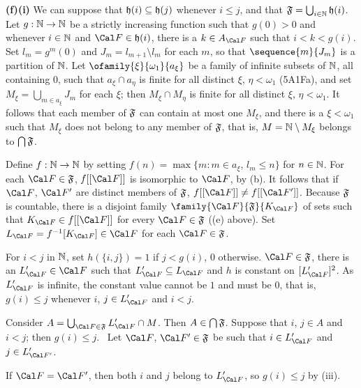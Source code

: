 {{\bf (f)(i)} We can suppose that $\frak h(i)\subseteq\frak h(j)$ whenever
$i\le j$, and that $\frak F=\bigcup_{i\in\Bbb N}\frak h(i)$.
Let $g:\Bbb N\to\Bbb N$ be a strictly increasing function
such that $g(0)>0$ and whenever $i\in\Bbb N$ and
$\Cal F\in \frak h(i)$, there is a $k\in A_{\Cal F}$ such that $i<k<g(i)$.
Set $l_m=g^m(0)$ and
$J_m=l_{m+1}\setminus l_m$ for each $m$, so that $\sequence{m}{J_m}$ is a
partition of $\Bbb N$.   Let $\ofamily{\xi}{\omega_1}{a_{\xi}}$ be a family
of infinite subsets of $\Bbb N$, all containing $0$,
such that $a_{\xi}\cap a_{\eta}$ is finite
for all distinct $\xi$, $\eta<\omega_1$ (5A1Fa), and set
$M_{\xi}=\bigcup_{m\in a_{\xi}}J_m$ for each $\xi$;  then
$M_{\xi}\cap M_{\eta}$ is finite for all distinct $\xi$, $\eta<\omega_1$.
It follows that each member of $\frak F$ can contain at most one $M_{\xi}$,
and there is a $\xi<\omega_1$ such that $M_{\xi}$ does not belong to any
member of $\frak F$, that is, $M=\Bbb N\setminus M_{\xi}$ belongs to
$\bigcap\frak F$.

\medskip

 Define $f:\Bbb N\to\Bbb N$ by setting
$f(n)=\max\{m:m\in a_{\xi}$, $l_m\le n\}$ for $n\in\Bbb N$.   For each
$\Cal F\in\frak F$, $f[[\Cal F]]$ is isomorphic to $\Cal F$, by (b).
It follows that if $\Cal F$, $\Cal F'$ are distinct
members of $\frak F$, $f[[\Cal F]]\ne f[[\Cal F']]$.   Because $\frak F$ is
countable,
there is a disjoint family $\family{\Cal F}{\frak F}{K_{\Cal F}}$ of sets
such that $K_{\Cal F}\in f[[\Cal F]]$ for every $\Cal F\in\frak F$
((e) above).   Set $L_{\Cal F}=f^{-1}[K_{\Cal F}]\in\Cal F$ for each
$\Cal F\in\frak F$.

\medskip

 For $i<j$ in $\Bbb N$, set $h(\{i,j\})=1$ if
$j<g(i)$, $0$ otherwise.
$\Cal F\in\frak F$, there is an $L'_{\Cal F}\in\Cal F$ such that
$L'_{\Cal F}\subseteq L_{\Cal F}$ and $h$ is constant on
$[L'_{\Cal F}]^2$.   As $L'_{\Cal F}$ is infinite, the constant value
cannot be $1$ and must be $0$, that is, $g(i)\le j$ whenever $i$,
$j\in L'_{\Cal F}$ and $i<j$.

\medskip

 Consider
$A=\bigcup_{\Cal F\in\frak F}L'_{\Cal F}\cap M$.   Then
$A\in\bigcap\frak F$.   Suppose that $i$, $j\in A$ and $i<j$;
then $g(i)\le j$.   \Prf\ Let
$\Cal F$, $\Cal F'\in\frak F$ be such that
$i\in L'_{\Cal F}$ and $j\in L'_{\Cal F'}$.

\medskip

 If $\Cal F=\Cal F'$, then both $i$ and $j$ belong to
$L'_{\Cal F}$, so $g(i)\le j$ by (iii).

}
